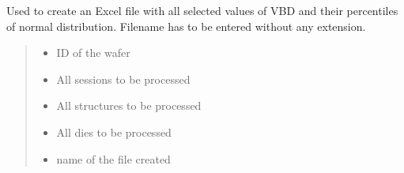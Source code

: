 \documentclass[letterpaper,10pt,english]{sphinxmanual}
\begin{document}
\begin{fulllineitems}
\label{\detokenize{excel:excel.excel_normal_VBD}}
\pysigstartsignatures
{}
\pysigstopsignatures
\sphinxAtStartPar
Used to create an Excel file with all selected values of VBD and their percentiles of normal distribution.
Filename has to be entered without any extension.
\begin{quote}\begin{description}
\begin{itemize}
\item {} 
\sphinxAtStartPar
{} \textendash{} ID of the wafer

\item {} 
\sphinxAtStartPar
{} \textendash{} All sessions to be processed

\item {} 
\sphinxAtStartPar
{} \textendash{} All structures to be processed

\item {} 
\sphinxAtStartPar
{} \textendash{} All dies to be processed

\item {} 
\sphinxAtStartPar
{} \textendash{} name of the file created

\end{itemize}

\end{description}\end{quote}

\end{fulllineitems}

\end{document}
